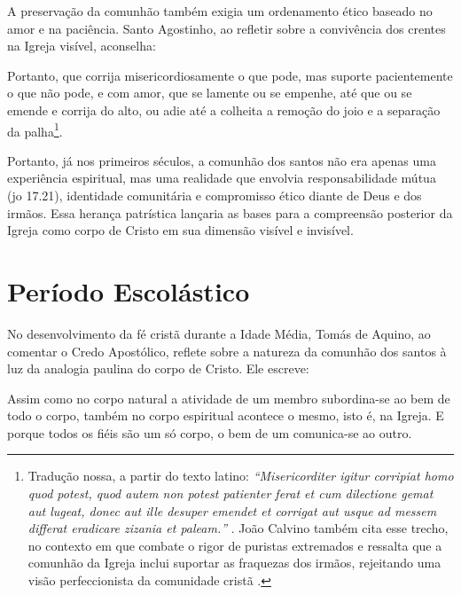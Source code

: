 A preservação da comunhão também exigia um ordenamento ético baseado no amor e na paciência. Santo Agostinho, ao refletir sobre a convivência dos crentes na Igreja visível, aconselha:

\begin{citacao}
    Portanto, que corrija misericordiosamente o que pode, mas suporte pacientemente o que não pode, e com amor, que se lamente ou se empenhe, até que ou se emende e corrija do alto, ou adie até a colheita a remoção do joio e a separação da palha\footnote{Tradução nossa, a partir do texto latino: \textit{``\foreignlanguage{latin}{Misericorditer igitur corripiat homo quod potest, quod autem non potest patienter ferat et cum dilectione gemat aut lugeat, donec aut ille desuper emendet et corrigat aut usque ad messem differat eradicare zizania et paleam.}''} \cite[livro~III, capítulo~1, seção~15]{agostinhoContraParmeniani}. João Calvino também cita esse trecho, no contexto em que combate o rigor de puristas extremados e ressalta que a comunhão da Igreja inclui suportar as fraquezas dos irmãos, rejeitando uma visão perfeccionista da comunidade cristã \cite[v.~4, cap.~1, seção~16, p.~1887]{calvino2022}.}.
\end{citacao}

Portanto, já nos primeiros séculos, a comunhão dos santos não era apenas uma experiência espiritual, mas uma realidade que envolvia responsabilidade mútua (\gls{jo} 17.21), identidade comunitária e compromisso ético diante de Deus e dos irmãos. Essa herança patrística lançaria as bases para a compreensão posterior da Igreja como corpo de Cristo em sua dimensão visível e invisível.

\section{Período Escolástico}

No desenvolvimento da fé cristã durante a Idade Média, Tomás de Aquino, ao comentar o Credo Apostólico, reflete sobre a natureza da comunhão dos santos à luz da analogia paulina do corpo de Cristo. Ele escreve:

\begin{citacao}
    Assim como no corpo natural a atividade de um membro subordina-se ao bem de todo o corpo, também no corpo espiritual acontece o mesmo, isto é, na Igreja. E porque todos os fiéis são um só corpo, o bem de um comunica-se ao outro. \cite[p.~79]{aquinoCredo2004}
\end{citacao}

